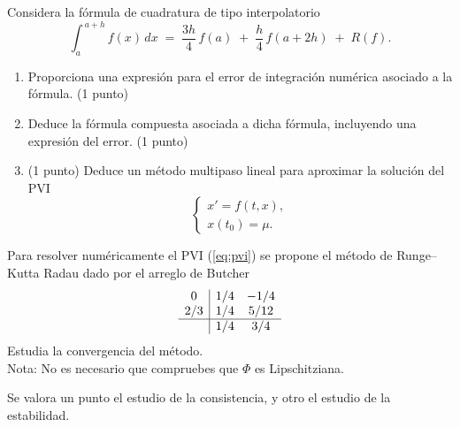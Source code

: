 \documentclass[12pt]{article}
\begin{document}
    \begin{ejercicio}[3 puntos]
        Considera la fórmula de cuadratura de tipo interpolatorio
        \[
        \int_{a}^{\,a+h} f(x)\,dx \;=\; \frac{3h}{4}\,f(a)\;+\;\frac{h}{4}\,f(a+2h)\;+\;R(f).
        \]
        \begin{enumerate}
          \item Proporciona una expresión para el error de integración numérica asociado a la fórmula. (1 punto)
          \item Deduce la fórmula compuesta asociada a dicha fórmula, incluyendo una expresión del error. (1 punto)
          \item (1 punto) Deduce un método multipaso lineal para aproximar la solución del PVI 
        \begin{equation}\label{eq:pvi}
            \begin{cases}
              x' = f(t,x),\\
              x(t_0)=\mu.
            \end{cases}
        \end{equation}            
        \end{enumerate}
    \end{ejercicio}
        
    \begin{ejercicio}[2 puntos]
        Para resolver numéricamente el PVI (\ref{eq:pvi}) se propone el método de Runge–Kutta Radau dado por el arreglo de Butcher
        \[
        \begin{array}{c|cc}
        0   & 1/4 & -1/4 \\
        2/3 & 1/4 & 5/12 \\
        \hline
              & 1/4 & 3/4
        \end{array}
        \]
        Estudia la convergencia del método. \\ 
        Nota: No es necesario que compruebes que $\Phi$ es Lipschitziana. \\ 

        \begin{observacion}
            Se valora un punto el estudio de la consistencia, y otro el estudio de la estabilidad.
        \end{observacion}
    \end{ejercicio}

    \newpage
        
\end{document}
